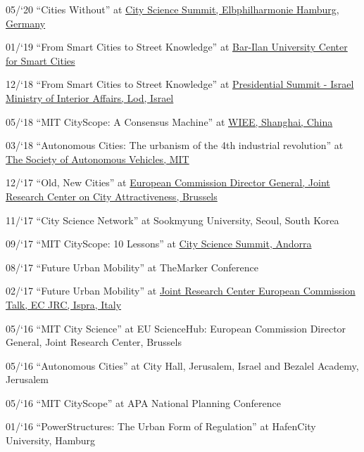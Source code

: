 \begin{tablist}
    \item[05/`20] \tab \enquote{Cities Without} at
    \href{https://www.youtube.com/watch?v=PZg6A_A65lQ}{City Science Summit, Elbphilharmonie Hamburg, Germany}

    \item[01/`19] \tab \enquote{From Smart Cities to Street Knowledge} at
    \href{https://law.biu.ac.il/sites/law/files/shared/mrym_khkmvt_lkhkmt_hrkhvb.pdf}{
        Bar-Ilan University Center for Smart Cities}

    \item[12/`18] \tab \enquote{From Smart Cities to Street Knowledge} at
    \href{https://www.youtube.com/watch?v=skIEkM9-1yg}{Presidential Summit - Israel Ministry of Interior Affairs, Lod, Israel}

    \item[05/`18] \tab \enquote{MIT CityScope: A Consensus Machine} at
    \href{https://wiee.tongji.edu.cn/CSS2018/}{WIEE, Shanghai, China}

    \item[03/`18] \tab \enquote{Autonomous Cities: The urbanism of the 4th industrial revolution} at \href{http://cameraculture.media.mit.edu/category/blog/}{The Society of Autonomous Vehicles, MIT}

    \item[12/`17] \tab \enquote{Old, New Cities} at \href{https://www.youtube.com/watch?v=AW-ljDEleLw}{European Commission Director General, Joint Research Center on City Attractiveness, Brussels}

    \item[11/`17] \tab \enquote{City Science Network} at {Sookmyung University, Seoul, South Korea}

    \item[09/`17] \tab \enquote{MIT CityScope: 10 Lessons} at \href{https://www.youtube.com/watch?v=bRNbap13I5w}{City Science Summit, Andorra}


    \item[08/`17] \tab \enquote{Future Urban Mobility} at {TheMarker Conference}

    \item[02/`17] \tab \enquote{Future Urban Mobility} at \href{https://ec.europa.eu/jrc/en/event/conference/14th-jrc-annual-training-composite-indicators-and-scoreboards} {Joint Research Center European Commission Talk, EC JRC, Ispra, Italy}

    \item[05/`16] \tab \enquote{MIT City Science} at {EU ScienceHub:
        European Commission Director General, Joint Research Center, Brussels}

    \item[05/`16] \tab \enquote{Autonomous Cities} at {City Hall, Jerusalem, Israel and Bezalel Academy, Jerusalem}


    \item[05/`16] \tab \enquote{MIT CityScope} at {APA National Planning Conference}

    \item[01/`16] \tab \enquote{PowerStructures: The Urban Form of Regulation} at {HafenCity University, Hamburg}

\end{tablist}


